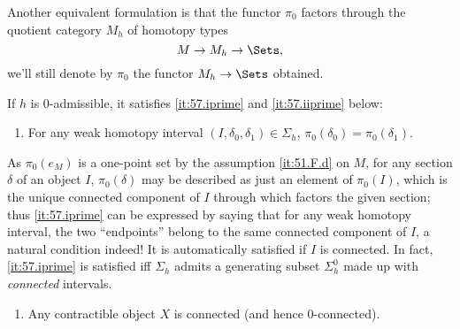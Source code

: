 Another equivalent formulation is that the functor $\pi_0$ factors
through the quotient category $M_h$ of homotopy types
\[M\to M_h\to\Sets,\]
we'll still denote by $\pi_0$ the functor $M_h\to\Sets$ obtained.

If $h$ is $0$-admissible, it satisfies \ref{it:57.iprime} and
\ref{it:57.iiprime} below:
\begin{enumerate}[label=(\roman*')]
\item\label{it:57.iprime}
  For any weak homotopy interval $(I,\delta_0,\delta_1)\in\Sigma_h$, $\pi_0(\delta_0)=\pi_0(\delta_1)$.
\end{enumerate}
As $\pi_0(e_M)$ is a one-point set by the assumption \ref{it:51.F.d}
on $M$, for any section $\delta$ of an object $I$, $\pi_0(\delta)$ may
be described as just an element of $\pi_0(I)$, which is the unique
connected component of $I$ through which factors the given section;
thus \ref{it:57.iprime} can be expressed by saying that for any weak
homotopy interval, the two ``endpoints'' belong to the same connected
component of $I$, a natural condition indeed! It is automatically
satisfied if $I$ is connected. In fact, \ref{it:57.iprime}
is satisfied if{f} $\Sigma_h$ admits a generating subset $\Sigma_h^0$
made up with \emph{connected} intervals.
\begin{enumerate}[label=(\roman*'),resume]
\item\label{it:57.iiprime}
  Any contractible object $X$ is connected (and hence $0$-connected).
\end{enumerate}

